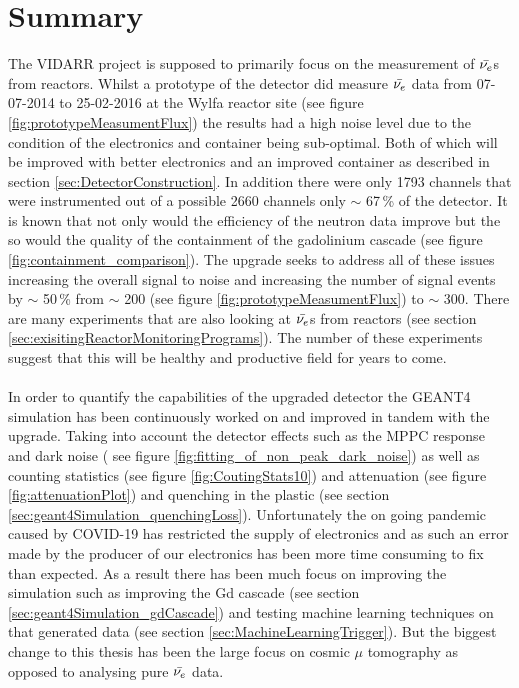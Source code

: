 
\chapter{Summary}

\ifpdf
    \graphicspath{{Chapter6/Figs/Raster/}{Chapter6/Figs/PDF/}{Chapter6/Figs/}}
\else
    \graphicspath{{Chapter6/Figs/Vector/}{Chapter6/Figs/}}
\fi

The VIDARR project is supposed to primarily focus on the measurement of $\Bar{\nu_e}$s from reactors. Whilst a prototype of the detector did measure $\Bar{\nu_e}$ data from 07-07-2014 to 25-02-2016 at the Wylfa reactor site (see figure \ref{fig:prototypeMeasumentFlux}) the results had a high noise level due to the condition of the electronics and container being sub-optimal. Both of which will be improved with better electronics and an improved container as described in section \ref{sec:DetectorConstruction}. In addition there were only 1793 channels that were instrumented out of a possible 2660 channels only $\sim$ 67\,\% of the detector. It is known that not only would the efficiency of the neutron data improve but the so would the quality of the containment of the gadolinium cascade (see figure \ref{fig:containment_comparison}). The upgrade seeks to address all of these issues increasing the overall signal to noise and increasing the number of signal events by $\sim$ 50\,\% from $\sim$ 200 (see figure \ref{fig:prototypeMeasumentFlux}) to $\sim$ 300. There are many experiments that are also looking at $\Bar{\nu_e}$s from reactors (see section \ref{sec:exisitingReactorMonitoringPrograms}). The number of these experiments suggest that this will be healthy and productive field for years to come.
\\\\In order to quantify the capabilities of the upgraded detector the GEANT4 simulation has been continuously worked on and improved in tandem with the upgrade. Taking into account the detector effects such as the MPPC response and dark noise ( see figure \ref{fig:fitting_of_non_peak_dark_noise}) as well as counting statistics (see figure \ref{fig:CoutingStats10}) and attenuation (see figure \ref{fig:attenuationPlot}) and quenching in the plastic (see section \ref{sec:geant4Simulation_quenchingLoss}). Unfortunately the on going pandemic caused by COVID-19 has restricted the supply of electronics and as such an error made by the producer of our electronics has been more time consuming to fix than expected. As a result there has been much focus on improving the simulation such as improving the Gd cascade (see section \ref{sec:geant4Simulation_gdCascade}) and testing machine learning techniques on that generated data (see section \ref{sec:MachineLearningTrigger}). But the biggest change to this thesis has been the large focus on cosmic $\mu$ tomography as opposed to analysing pure $\Bar{\nu_e}$ data.
